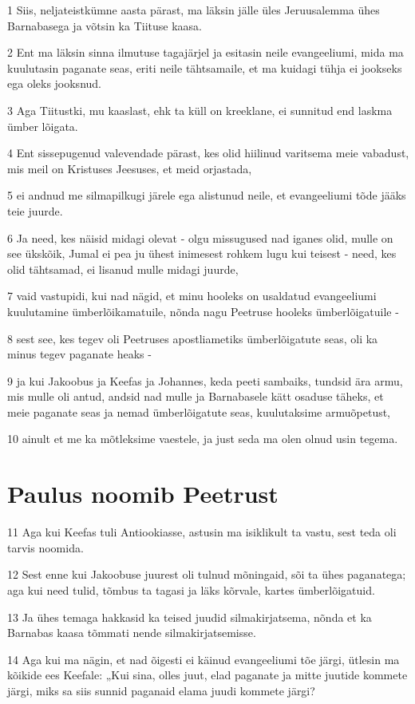 \par 1 Siis, neljateistkümne aasta pärast, ma läksin jälle üles Jeruusalemma ühes Barnabasega ja võtsin ka Tiituse kaasa.
\par 2 Ent ma läksin sinna ilmutuse tagajärjel ja esitasin neile evangeeliumi, mida ma kuulutasin paganate seas, eriti neile tähtsamaile, et ma kuidagi tühja ei jookseks ega oleks jooksnud.
\par 3 Aga Tiitustki, mu kaaslast, ehk ta küll on kreeklane, ei sunnitud end laskma ümber lõigata.
\par 4 Ent sissepugenud valevendade pärast, kes olid hiilinud varitsema meie vabadust, mis meil on Kristuses Jeesuses, et meid orjastada,
\par 5 ei andnud me silmapilkugi järele ega alistunud neile, et evangeeliumi tõde jääks teie juurde.
\par 6 Ja need, kes näisid midagi olevat - olgu missugused nad iganes olid, mulle on see ükskõik, Jumal ei pea ju ühest inimesest rohkem lugu kui teisest - need, kes olid tähtsamad, ei lisanud mulle midagi juurde,
\par 7 vaid vastupidi, kui nad nägid, et minu hooleks on usaldatud evangeeliumi kuulutamine ümberlõikamatuile, nõnda nagu Peetruse hooleks ümberlõigatuile -
\par 8 sest see, kes tegev oli Peetruses apostliametiks ümberlõigatute seas, oli ka minus tegev paganate heaks -
\par 9 ja kui Jakoobus ja Keefas ja Johannes, keda peeti sambaiks, tundsid ära armu, mis mulle oli antud, andsid nad mulle ja Barnabasele kätt osaduse täheks, et meie paganate seas ja nemad ümberlõigatute seas, kuulutaksime armuõpetust,
\par 10 ainult et me ka mõtleksime vaestele, ja just seda ma olen olnud usin tegema.

\section*{Paulus noomib Peetrust}

\par 11 Aga kui Keefas tuli Antiookiasse, astusin ma isiklikult ta vastu, sest teda oli tarvis noomida.
\par 12 Sest enne kui Jakoobuse juurest oli tulnud mõningaid, sõi ta ühes paganatega; aga kui need tulid, tõmbus ta tagasi ja läks kõrvale, kartes ümberlõigatuid.
\par 13 Ja ühes temaga hakkasid ka teised juudid silmakirjatsema, nõnda et ka Barnabas kaasa tõmmati nende silmakirjatsemisse.
\par 14 Aga kui ma nägin, et nad õigesti ei käinud evangeeliumi tõe järgi, ütlesin ma kõikide ees Keefale: „Kui sina, olles juut, elad paganate ja mitte juutide kommete järgi, miks sa siis sunnid paganaid elama juudi kommete järgi?

